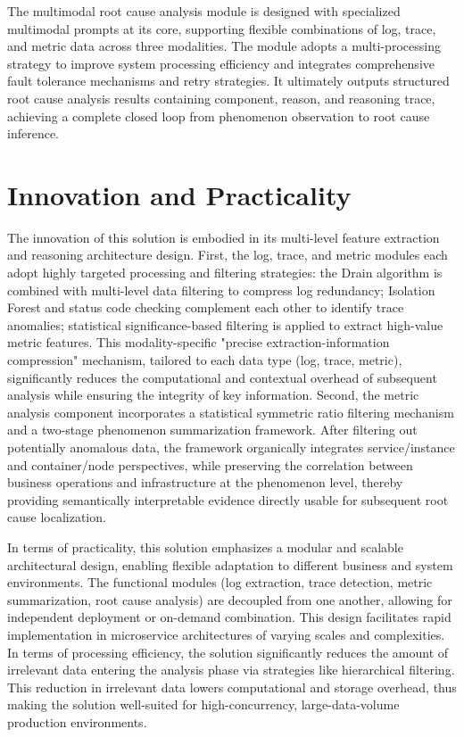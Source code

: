 \documentclass[10pt]{article}
\begin{document}
The multimodal root cause analysis module is designed with specialized multimodal prompts at its core, supporting flexible combinations of log, trace, and metric data across three modalities. The module adopts a multi-processing strategy to improve system processing efficiency and integrates comprehensive fault tolerance mechanisms and retry strategies. It ultimately outputs structured root cause analysis results containing component, reason, and reasoning trace, achieving a complete closed loop from phenomenon observation to root cause inference.


\section{Innovation and Practicality}
\label{sec:innovation}

The innovation of this solution is embodied in its multi-level feature extraction and reasoning architecture design. First, the log, trace, and metric modules each adopt highly targeted processing and filtering strategies: the Drain algorithm is combined with multi-level data filtering to compress log redundancy; Isolation Forest and status code checking complement each other to identify trace anomalies; statistical significance-based filtering is applied to extract high-value metric features. This modality-specific "precise extraction-information compression" mechanism, tailored to each data type (log, trace, metric), significantly reduces the computational and contextual overhead of subsequent analysis while ensuring the integrity of key information. Second, the metric analysis component incorporates a statistical symmetric ratio filtering mechanism and a two-stage phenomenon summarization framework. After filtering out potentially anomalous data, the framework organically integrates service/instance and container/node perspectives, while preserving the correlation between business operations and infrastructure at the phenomenon level, thereby providing semantically interpretable evidence directly usable for subsequent root cause localization.

In terms of practicality, this solution emphasizes a modular and scalable architectural design, enabling flexible adaptation to different business and system environments. The functional modules (log extraction, trace detection, metric summarization, root cause analysis) are decoupled from one another, allowing for independent deployment or on-demand combination. This design facilitates rapid implementation in microservice architectures of varying scales and complexities. In terms of processing efficiency, the solution significantly reduces the amount of irrelevant data entering the analysis phase via strategies like hierarchical filtering. This reduction in irrelevant data lowers computational and storage overhead, thus making the solution well-suited for high-concurrency, large-data-volume production environments.
\end{document}
